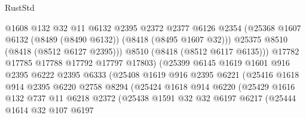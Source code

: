 \begin{lexlean}{RustStd}
\begin{coremodule}
                                @1608
                                @132
                                @32
                                @11
                                @6132
                                @2395
                                @2372
                                @2377
                                @6126
                                @2354
                                (@25368 @1607 @6132 (@8489 (@8490 @6132)) (@8418 (@8495 @1607 @32)))
                                @25375
                                @8510
                                (@8418 (@8512 @6127 @2395)))
                              @8510
                              (@8418 (@8512 @6117 @6135)))
                            @17782
                            @17785
                            @17788
                            @17792
                            @17797
                            @17803)
                          (@25399
                            @6145
                            @1619
                            @1601
                            @916
                            @2395
                            @6222
                            @2395
                            @6333
                            (@25408
                              @1619
                              @916
                              @2395
                              @6221
                              (@25416
                                @1618
                                @914
                                @2395
                                @6220
                                @2758
                                @8294
                                (@25424
                                  @1618
                                  @914
                                  @6220
                                  (@25429
                                    @1616
                                    @132
                                    @737
                                    @11
                                    @6218
                                    @2372
                                    (@25438
                                      @1591
                                      @32
                                      @32
                                      @6197
                                      @6217
                                      (@25444
                                        @1614
                                        @32
                                        @107
                                        @6197

\end{coremodule}
\end{lexlean}
